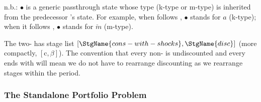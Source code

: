 \documentclass[titlepage, headings=optiontotocandhead]{econark}
\begin{document}
\begin{table}[h]\caption{Discounting {\Stg} ($\beta$) {\Prchs}}\label{tab:prchs-disc}
\newsavebox{\disctablebox}%
\begin{center}
    \usebox{\disctablebox}

    \parbox{\wd\disctablebox}{\footnotesize n.b.: $\bullet$ is a generic passthrough state whose type (k-type or m-type) is inherited from the predecessor {\stg}'s {\Continuation} state.  For example, when  follows , $\bullet$ stands for $a$ (k-type); when it follows , $\bullet$ stands for $\check{m}$ (m-type).}
  \end{center}
  \end{table}


  The two-{\stg} {\interval} has stage list $[\StgName{cons-with-shocks}, \StgName{disc}]$ (more compactly, $[\mathrm{c}, \beta]$).  The convention that every non- {\stg} is undiscounted and every {\interval} ends with  will mean we do not have to rearrange discounting as we rearrange stages within the period.

\hypertarget{standalone-portfolio-problem}{}
\subsubsection{The Standalone Portfolio Problem}\label{subsec:MCTheory}
\end{document}
